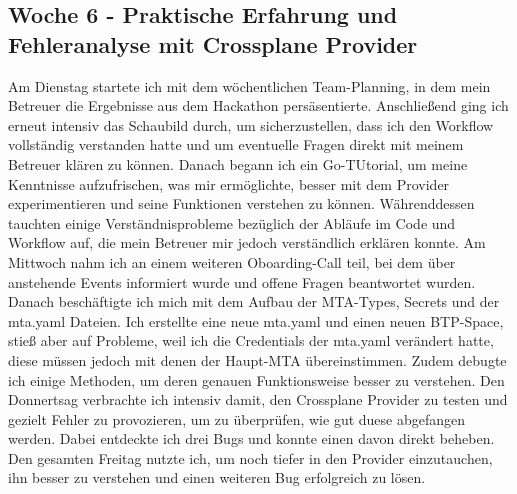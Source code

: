 \subsection{Woche 6 - Praktische Erfahrung und Fehleranalyse mit Crossplane Provider}
Am Dienstag startete ich mit dem wöchentlichen Team-Planning, in dem mein Betreuer die Ergebnisse aus dem Hackathon persäsentierte.
Anschließend ging ich erneut intensiv das Schaubild durch, um sicherzustellen, dass ich den Workflow vollständig verstanden hatte und um eventuelle Fragen direkt mit meinem Betreuer klären zu können.
Danach begann ich ein Go-TUtorial, um meine Kenntnisse aufzufrischen, was mir ermöglichte, besser mit dem Provider experimentieren und seine Funktionen verstehen zu können.
Währenddessen tauchten einige Verständnisprobleme bezüglich der Abläufe im Code und Workflow auf, die mein Betreuer mir jedoch verständlich erklären konnte.
Am Mittwoch nahm ich an einem weiteren Oboarding-Call teil, bei dem über anstehende Events informiert wurde und offene Fragen beantwortet wurden.
Danach beschäftigte ich mich mit dem Aufbau der MTA-Types, Secrets und der mta.yaml Dateien. 
Ich erstellte eine neue mta.yaml und einen neuen BTP-Space, stieß aber auf Probleme, weil ich die Credentials der mta.yaml verändert hatte, diese müssen jedoch mit denen der Haupt-MTA übereinstimmen.
Zudem debugte ich einige Methoden, um deren genauen Funktionsweise besser zu verstehen.
Den Donnertsag verbrachte ich intensiv damit, den Crossplane Provider zu testen und gezielt Fehler zu provozieren, um zu überprüfen, wie gut duese abgefangen werden.
Dabei entdeckte ich drei Bugs und konnte einen davon direkt beheben.
Den gesamten Freitag nutzte ich, um noch tiefer in den Provider einzutauchen, ihn besser zu verstehen und einen weiteren Bug erfolgreich zu lösen.

